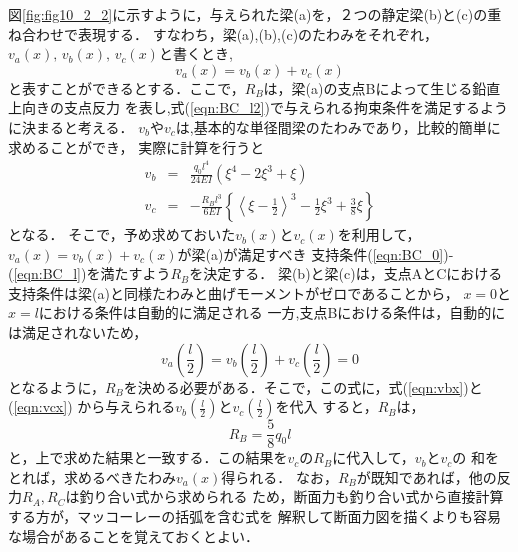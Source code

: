 \documentclass[10pt,a4j]{jbook}
\begin{document}
\begin{enumerate}
図\ref{fig:fig10_2_2}に示すように，与えられた梁(a)を，２つの静定梁(b)と(c)の重ね合わせで表現する．
すなわち，梁(a),(b),(c)のたわみをそれぞれ，$v_a(x),\,v_b(x),\,v_c(x)$と書くとき,
\begin{equation}
	v_a(x)=v_b(x)+v_c(x)
	\label{eqn:v_sum}
\end{equation}
と表すことができるとする．ここで，$R_B$は，梁(a)の支点Bによって生じる鉛直上向きの支点反力
		を表し,式(\ref{eqn:BC_l2})で与えられる拘束条件を満足するように決まると考える．
$v_b$や$v_c$は,基本的な単径間梁のたわみであり，比較的簡単に求めることができ，
実際に計算を行うと
\begin{eqnarray}
	v_b&= & 
		\frac{q_0l^4}{24EI} \left( \xi^4-2\xi^3 +\xi \right)
	\label{eqn:vbx}
	\\
	v_c&= & 
		-\frac{R_Bl^3}{6EI} \left\{ \left< \xi-\frac{1}{2}\right>^3 
		-\frac{1}{2}\xi^3 +\frac{3}{8}\xi \right\}
	\label{eqn:vcx}
\end{eqnarray}
となる．
そこで，予め求めておいた$v_b(x)$と$v_c(x)$を利用して，$v_a(x)=v_b(x)+v_c(x)$が梁(a)が満足すべき
支持条件(\ref{eqn:BC_0})-(\ref{eqn:BC_l})を満たすよう$R_B$を決定する．
梁(b)と梁(c)は，支点AとCにおける支持条件は梁(a)と同様たわみと曲げモーメントがゼロであることから，
$x=0$と$x=l$における条件は自動的に満足される
一方,支点Bにおける条件は，自動的には満足されないため，
\begin{equation}
	v_a\left(\frac{l}{2}\right)
	=
	v_b\left(\frac{l}{2}\right)
	+
	v_c\left(\frac{l}{2}\right)
	=0
	\label{eqn:constraint}
\end{equation}
となるように，$R_B$を決める必要がある．そこで，この式に，式(\ref{eqn:vbx})と(\ref{eqn:vcx})
から与えられる$v_b\left(\frac{l}{2}\right)$と$v_c\left(\frac{l}{2}\right)$を代入
すると，$R_B$は，
\begin{equation}
	R_B=\frac{5}{8}q_0l
\end{equation}
と，上で求めた結果と一致する．この結果を$v_c$の$R_B$に代入して，$v_b$と$v_c$の
和をとれば，求めるべきたわみ$v_a(x)$得られる．
なお，$R_B$が既知であれば，他の反力$R_A,R_C$は釣り合い式から求められる
ため，断面力も釣り合い式から直接計算する方が，マッコーレーの括弧を含む式を
解釈して断面力図を描くよりも容易な場合があることを覚えておくとよい．
\end{enumerate}
\end{document}
